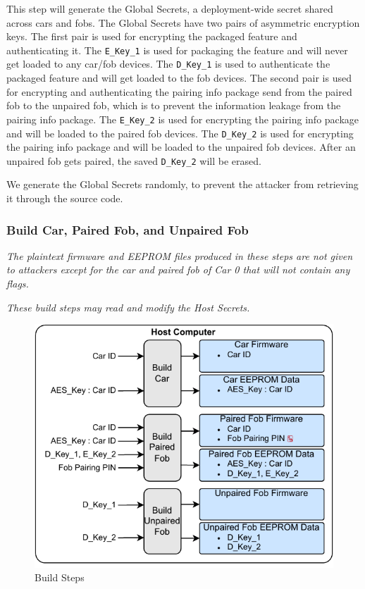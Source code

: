 \documentclass[11pt,oneside,onecolumn,letterpaper]{article}
\begin{document}
This step will generate the Global Secrets, a deployment-wide secret shared across cars and fobs.
The Global Secrets have two pairs of asymmetric encryption keys.
The first pair is used for encrypting the packaged feature and authenticating it.
The \verb|E_Key_1| is used for packaging the feature and will never get loaded to any car/fob devices.
The \verb|D_Key_1| is used to authenticate the packaged feature and will get loaded to the fob devices.
The second pair is used for encrypting and authenticating the pairing info package send from the paired fob to the unpaired fob, which is to prevent the information leakage from the pairing info package.
The \verb|E_Key_2| is used for encrypting the pairing info package and will be loaded to the paired fob devices.
The \verb|D_Key_2| is used for encrypting the pairing info package and will be loaded to the unpaired fob devices.
After an unpaired fob gets paired, the saved \verb|D_Key_2| will be erased.

We generate the Global Secrets randomly, to prevent the attacker from retrieving it through the source code.

\subsubsection{Build Car, Paired Fob, and Unpaired Fob}

\textit{The plaintext firmware and EEPROM files produced in these steps are not given to attackers except for the car and paired fob of Car 0 that will not contain any flags.}

\textit{These build steps may read and modify the Host Secrets.}

\begin{figure}[!htbp]
	\begin{centering}
		\includegraphics[width = .6\textwidth]{pic/build_step.pdf}
		\caption{Build Steps}
		\label{fig:build_step}
	\end{centering}
\end{figure}
\end{document}
